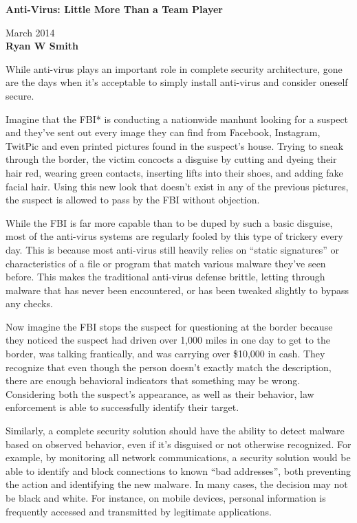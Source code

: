 \documentclass[a4paper]{article}
\begin{document}
\begin{center}
  \textbf{Anti-Virus: Little More Than a Team Player}
\end{center}

 March 2014 \\
\textbf{Ryan W Smith}

While anti-virus plays an important role in complete security architecture, gone
are the days when it's acceptable to simply install anti-virus and consider
oneself secure.

Imagine that the FBI* is conducting a nationwide manhunt looking for a suspect
and they've sent out every image they can find from Facebook, Instagram, TwitPic
and even printed pictures found in the suspect's house. Trying to sneak through
the border, the victim concocts a disguise by cutting and dyeing their hair red,
wearing green contacts, inserting lifts into their shoes, and adding fake facial
hair. Using this new look that doesn't exist in any of the previous pictures,
the suspect is allowed to pass by the FBI without objection.

While the FBI is far more capable than to be duped by such a basic disguise,
most of the anti-virus systems are regularly fooled by this type of trickery
every day. This is because most anti-virus still heavily relies on
\enquote{static signatures} or characteristics of a file or program that match
various malware they've seen before. This makes the traditional anti-virus
defense brittle, letting through malware that has never been encountered, or has
been tweaked slightly to bypass any checks.

Now imagine the FBI stops the suspect for questioning at the border because they
noticed the suspect had driven over 1,000 miles in one day to get to the border,
was talking frantically, and was carrying over \$10,000 in cash. They recognize
that even though the person doesn't exactly match the description, there are
enough behavioral indicators that something may be wrong. Considering both the
suspect's appearance, as well as their behavior, law enforcement is able to
successfully identify their target.

Similarly, a complete security solution should have the ability to detect
malware based on observed behavior, even if it's disguised or not otherwise
recognized. For example, by monitoring all network communications, a security
solution would be able to identify and block connections to known \enquote{bad
addresses}, both preventing the action and identifying the new malware. In many
cases, the decision may not be black and white. For instance, on mobile devices,
personal information is frequently accessed and transmitted by legitimate
applications.
\end{document}
